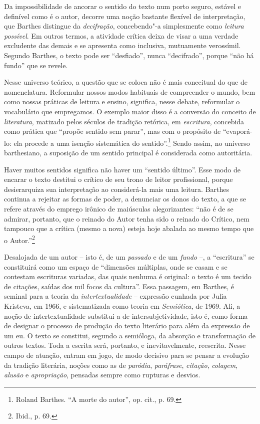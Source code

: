 Da impossibilidade de ancorar o sentido do texto num porto seguro,
estável e definível como é o autor, decorre uma noção bastante flexível
de interpretação, que Barthes distingue da \emph{decifração}, concebendo"-a
simplesmente como \emph{leitura possível}. Em outros termos, a atividade
crítica deixa de visar a uma verdade excludente das demais e se
apresenta como inclusiva, mutuamente verossímil. Segundo Barthes, o
texto pode ser ``desfiado'', nunca ``decifrado'', porque ``não há
fundo'' que se revele.

Nesse universo teórico, a questão que se coloca não é mais conceitual do
que de nomenclatura. Reformular nossos modos habituais de compreender o
mundo, bem como nossas práticas de leitura e ensino, significa, nesse
debate, reformular o vocabulário que empregamos. O exemplo maior disso é
a conversão do conceito de \emph{literatura}, matizado pelos séculos de
tradição retórica, em \emph{escritura}, concebida como prática que ``propõe
sentido sem parar'', mas com o propósito de ``evaporá-lo: ela procede a
uma isenção sistemática do sentido''.\footnote{Roland Barthes. ``A morte
  do autor'', op. cit., p. 69.} Sendo assim, no universo barthesiano, a
suposição de um sentido principal é considerada como autoritária.

Haver muitos sentidos significa não haver um ``sentido último''. Esse
modo de encarar o texto destitui o crítico de seu trono de leitor
profissional, porque desierarquiza sua interpretação ao considerá-la
mais uma leitura. Barthes continua a rejeitar as formas de poder, a
denunciar os donos do texto, a que se refere através do emprego irônico
de maiúsculas alegorizantes: ``não é de se admirar, portanto, que o
reinado do Autor tenha sido o reinado do Crítico, nem tampouco que a
crítica (mesmo a nova) esteja hoje abalada ao mesmo tempo que o
Autor.''\footnote{Ibid., p. 69.}

Desalojada de um autor -- isto é, de um \emph{passado} e de um \emph{fundo} --, a
``escritura'' se constituirá como um espaço de ``dimensões múltiplas,
onde se casam e se contestam escrituras variadas, das quais nenhuma é
original: o texto é um tecido de citações, saídas dos mil focos da
cultura''. Essa passagem, em Barthes, é seminal para a teoria da
\emph{intertextualidade} -- expressão cunhada por Julia Kristeva, em 1966, e
sistematizada como teoria em \emph{Semiótica}, de 1969. Ali, a noção de
intertextualidade substitui a de intersubjetividade, isto é, como forma
de designar o processo de produção do texto literário para além da
expressão de um eu. O texto se constitui, segundo a semióloga, da
absorção e transformação de outros textos. Toda a escrita será,
portanto, e inevitavelmente, reescrita. Nesse campo de atuação, entram
em jogo, de modo decisivo para se pensar a evolução da tradição
literária, noções como as de \emph{paródia}, \emph{paráfrase}, \emph{citação}, \emph{colagem},
\emph{alusão} e \emph{apropriação}, pensadas sempre como rupturas e desvios.


